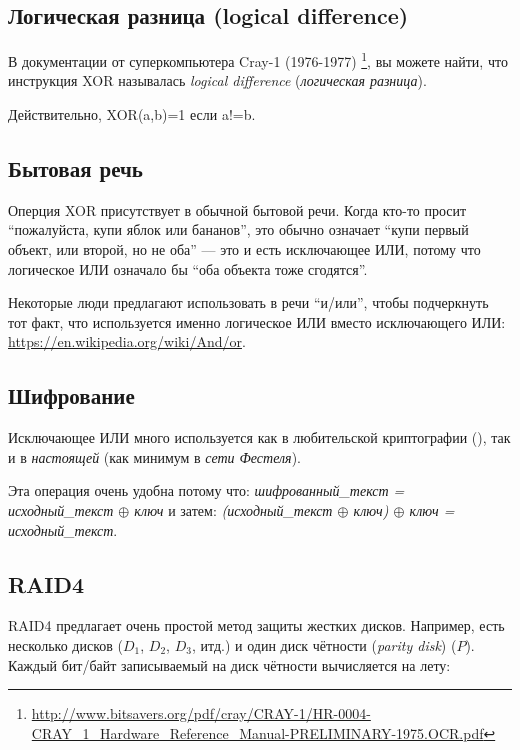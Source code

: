 ﻿
\label{XOR_property}



\subsection{Логическая разница (logical difference)}

В документации от суперкомпьютера Cray-1 (1976-1977)
\footnote{\url{http://www.bitsavers.org/pdf/cray/CRAY-1/HR-0004-CRAY_1_Hardware_Reference_Manual-PRELIMINARY-1975.OCR.pdf}},
вы можете найти, что инструкция XOR называлась \emph{logical difference} (\emph{логическая разница}).

Действительно, XOR(a,b)=1 если a!=b.

\subsection{Бытовая речь}

Оперция XOR присутствует в обычной бытовой речи.
Когда кто-то просит ``пожалуйста, купи яблок или бананов'',
это обычно означает ``купи первый объект, или второй, но не оба'' --- это и есть исключающее ИЛИ,
потому что логическое ИЛИ означало бы ``оба объекта тоже сгодятся''.

Некоторые люди предлагают использовать в речи ``и/или'', чтобы подчеркнуть тот факт, что используется именно логическое ИЛИ
вместо исключающего ИЛИ: \url{https://en.wikipedia.org/wiki/And/or}.

\subsection{Шифрование}

Исключающее ИЛИ много используется как в любительской криптографии (), так и в \emph{настоящей}
(как минимум в \emph{сети Фестеля}).

Эта операция очень удобна потому что:
\emph{шифрованный\_текст = исходный\_текст $\oplus$ ключ} и затем:
\emph{(исходный\_текст $\oplus$ ключ) $\oplus$ ключ = исходный\_текст}.

\subsection{\ac{RAID}4}

\ac{RAID}4 предлагает очень простой метод защиты жестких дисков.
Например, есть несколько дисков ($D_1$, $D_2$, $D_3$, итд.) и один диск чётности (\emph{parity disk}) ($P$).
Каждый бит/байт записываемый на диск чётности вычисляется на лету:

